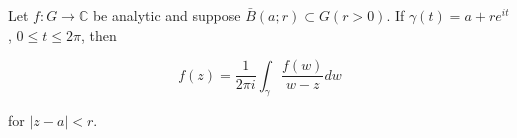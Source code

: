 Let $f: G \to \mathbb{C}$ be analytic and suppose $\bar{B}(a; r) \subset G(r > 0)$. If $\gamma(t) = a + re^{it}$, $0 \leq t \leq 2\pi$, then

$$f(z) = \frac{1}{2\pi i} \int_{\gamma} \frac{f(w)}{w - z} dw$$

for $|z - a| < r$.